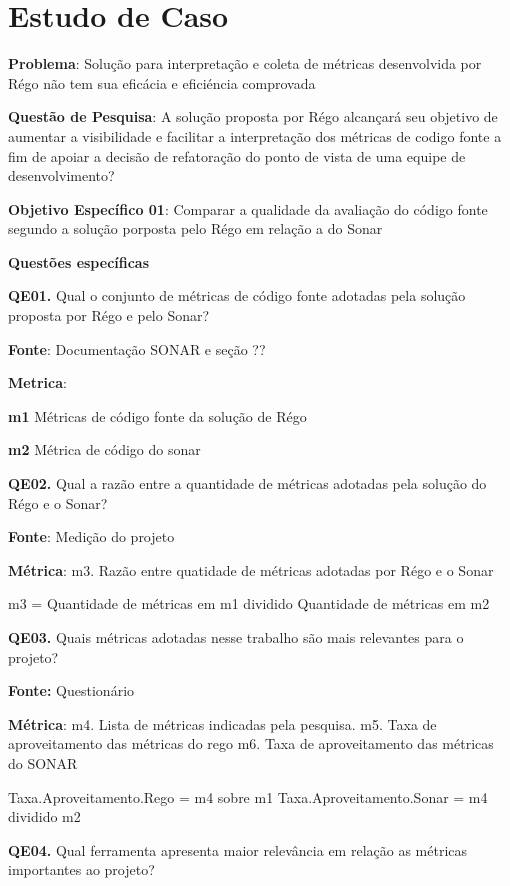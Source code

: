 \chapter{Estudo de Caso}
\label{estudo de caso}

\textbf{Problema}: Solução para interpretação e coleta de métricas desenvolvida por R{\'e}go não tem sua eficácia e efici{\'e}ncia comprovada

\textbf{Questão de Pesquisa}: A solução proposta por R{\'e}go alcançará seu objetivo de  aumentar a visibilidade e facilitar a interpretação dos métricas de codigo fonte a fim de apoiar a decisão de refatoração do ponto de vista de uma equipe de desenvolvimento?

\textbf{Objetivo Específico 01}: Comparar a qualidade da avaliação do código fonte segundo a solução porposta pelo R{\'e}go em relação a do Sonar

\textbf{Questões específicas}

\textbf{QE01.} Qual o conjunto de  métricas de código fonte 	 adotadas pela solução proposta por R{\'e}go e pelo Sonar? 

\textbf{Fonte}: Documentação SONAR e seção ??



\textbf{Metrica}: 

\textbf{m1} Métricas de código fonte da solução de R{\'e}go

\textbf{m2} Métrica de código do sonar



\textbf{QE02.} Qual a razão entre a quantidade de métricas adotadas pela solução do R{\'e}go e o Sonar?

\textbf{Fonte}:  Medição do projeto

\textbf{Métrica}:
	m3. Razão entre quatidade de métricas adotadas por R{\'e}go e o Sonar

m3 = Quantidade de métricas em m1 dividido  Quantidade de métricas em  m2


\textbf{QE03.} Quais métricas adotadas nesse trabalho são mais relevantes para o projeto?

\textbf{Fonte:} Questionário

\textbf{Métrica}: m4. Lista de métricas indicadas pela pesquisa.
	   m5. Taxa de aproveitamento das métricas do rego
   m6. Taxa de aproveitamento das métricas do SONAR

Taxa.Aproveitamento.Rego = m4 sobre m1
Taxa.Aproveitamento.Sonar = m4 dividido m2


\textbf{QE04.} Qual ferramenta apresenta maior relevância em relação as métricas importantes ao projeto?


